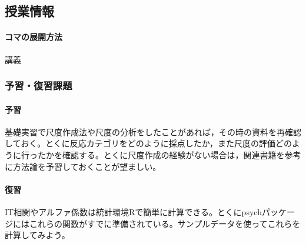 \subsection{授業情報}
\paragraph{コマの展開方法}
講義
\subsubsection{予習・復習課題}
\paragraph{予習}基礎実習で尺度作成法や尺度の分析をしたことがあれば，その時の資料を再確認しておく。とくに反応カテゴリをどのように採点したか，また尺度の評価どのように行ったかを確認する。とくに尺度作成の経験がない場合は，関連書籍\citet{}を参考に方法論を予習しておくことが望ましい。
\paragraph{復習}IT相関やアルファ係数は統計環境Rで簡単に計算できる。とくにpsychパッケージにはこれらの関数がすでに準備されている。サンプルデータを使ってこれらを計算してみよう。
